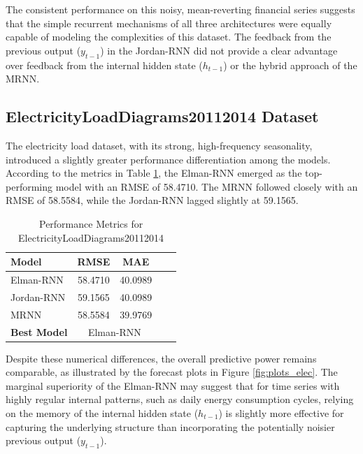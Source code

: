 \documentclass[conference, 10pt]{IEEEtran}
\begin{document}
The consistent performance on this noisy, mean-reverting financial series suggests that the simple recurrent mechanisms
of all three architectures were equally capable of modeling the complexities of this dataset. The feedback from
the previous output ($y_{t-1}$) in the Jordan-RNN did not provide a clear advantage over feedback from the internal hidden
state ($h_{t-1}$) or the hybrid approach of the MRNN.

\subsection{ElectricityLoadDiagrams20112014 Dataset}
The electricity load dataset, with its strong, high-frequency seasonality, introduced a slightly greater performance
differentiation among the models. According to the metrics in Table \ref{tab:results_elec}, the Elman-RNN emerged as the
top-performing model with an RMSE of 58.4710. The MRNN followed closely with an RMSE of 58.5584, while the Jordan-RNN
lagged slightly at 59.1565.
\begin{table}[H]
    \centering
    \begin{tabular}{|l|c|c|c|c|}
        \hline
        \textbf{Model}& \textbf{RMSE} & \textbf{MAE} \\ 
        \hline
        Elman-RNN& 58.4710 & 40.0989 \\ 
        \hline
        Jordan-RNN & 59.1565 & 40.0989 \\ 
        \hline
        MRNN &  58.5584 & 39.9769 \\ 
        \hline
        \textbf{Best Model} & \multicolumn{2}{c|}{{Elman-RNN}}\\ 
        \hline
    \end{tabular}
    \vspace{4pt}
    \caption{Performance Metrics for ElectricityLoadDiagrams20112014}
    \label{tab:results_elec}
\end{table}

Despite these numerical differences, the overall predictive power remains comparable, as illustrated by the forecast
plots in Figure \ref{fig:plots_elec}. The marginal superiority of the Elman-RNN may suggest that for time series with
highly regular internal patterns, such as daily energy consumption cycles, relying on the memory of the internal hidden
state ($h_{t-1}$) is slightly more effective for capturing the underlying structure than incorporating the potentially
noisier previous output ($y_{t-1}$).
\end{document}
